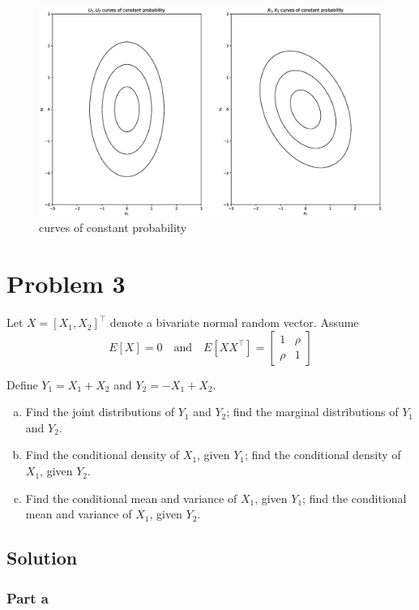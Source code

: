 \documentclass[a4paper]{article}
\begin{document}
\begin{figure}[H]
\begin{center}
  \includegraphics[scale=0.4]{hw2-2.eps}
\end{center}
\caption{curves of constant probability}
\label{fig:Curves of Constant probability}
\end{figure}

\section*{Problem 3}%
Let $X = [X_1, X_2]^\top$ denote a bivariate normal random vector. Assume 
\[
  E[X] = 0 \quad \text{and} \quad E[XX^\top] = 
  \begin{bmatrix}
    1 & \rho \\
    \rho & 1
  \end{bmatrix}
\]

Define $Y_1 = X_1 + X_2$ and $Y_2 = -X_1 + X_2$.
\begin{enumerate}[a.]
  \item Find the joint distributions of $Y_1$ and $Y_2$; find the marginal distributions of $Y_1$ and $Y_2$.
  \item Find the conditional density of $X_1$, given $Y_1$; find the conditional density of $X_1$, given $Y_2$.
  \item Find the conditional mean and variance of $X_1$, given $Y_1$; find the conditional mean and variance of $X_1$, given $Y_2$.
\end{enumerate}

\subsection*{Solution}%

\subsubsection*{Part a}%
\end{document}
